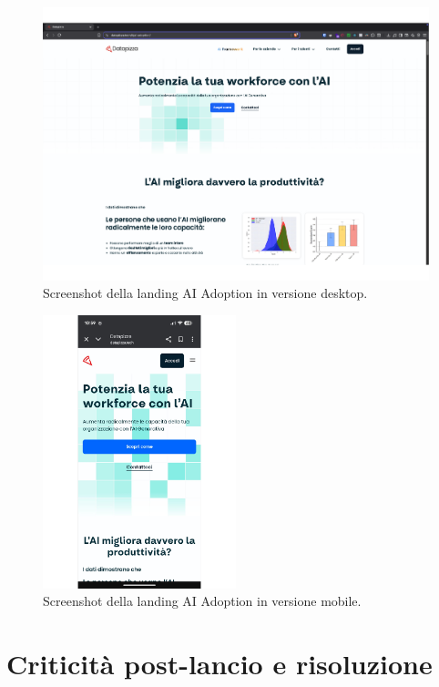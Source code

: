\begin{figure}[h!]
    \centering
    \includegraphics[width=\textwidth]{chapters/figures/landingAI.pdf}
    \caption{Screenshot della landing AI Adoption in versione desktop.}
    \label{fig:landing-desktop}
\end{figure}

\clearpage

\begin{figure}[h!]
    \centering
    \includegraphics[width=0.5\textwidth]{chapters/figures/landingAImobile.pdf}
    \caption{Screenshot della landing AI Adoption in versione mobile.}
    \label{fig:landing-mobile}
\end{figure}

\section{Criticità post-lancio e risoluzione}

